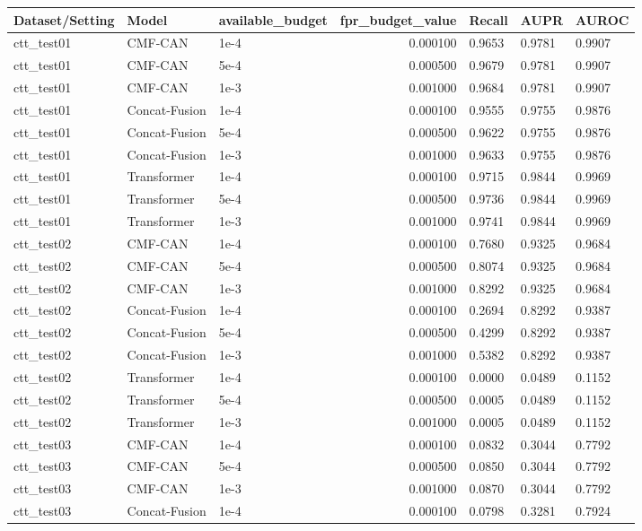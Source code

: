 \begin{tabular}{lllrlll}
\toprule
Dataset/Setting & Model & available_budget & fpr_budget_value & Recall & AUPR & AUROC \\
\midrule
ctt_test01 & CMF-CAN & 1e-4 & 0.000100 & 0.9653 & 0.9781 & 0.9907 \\
ctt_test01 & CMF-CAN & 5e-4 & 0.000500 & 0.9679 & 0.9781 & 0.9907 \\
ctt_test01 & CMF-CAN & 1e-3 & 0.001000 & 0.9684 & 0.9781 & 0.9907 \\
ctt_test01 & Concat-Fusion & 1e-4 & 0.000100 & 0.9555 & 0.9755 & 0.9876 \\
ctt_test01 & Concat-Fusion & 5e-4 & 0.000500 & 0.9622 & 0.9755 & 0.9876 \\
ctt_test01 & Concat-Fusion & 1e-3 & 0.001000 & 0.9633 & 0.9755 & 0.9876 \\
ctt_test01 & Transformer & 1e-4 & 0.000100 & 0.9715 & 0.9844 & 0.9969 \\
ctt_test01 & Transformer & 5e-4 & 0.000500 & 0.9736 & 0.9844 & 0.9969 \\
ctt_test01 & Transformer & 1e-3 & 0.001000 & 0.9741 & 0.9844 & 0.9969 \\
ctt_test02 & CMF-CAN & 1e-4 & 0.000100 & 0.7680 & 0.9325 & 0.9684 \\
ctt_test02 & CMF-CAN & 5e-4 & 0.000500 & 0.8074 & 0.9325 & 0.9684 \\
ctt_test02 & CMF-CAN & 1e-3 & 0.001000 & 0.8292 & 0.9325 & 0.9684 \\
ctt_test02 & Concat-Fusion & 1e-4 & 0.000100 & 0.2694 & 0.8292 & 0.9387 \\
ctt_test02 & Concat-Fusion & 5e-4 & 0.000500 & 0.4299 & 0.8292 & 0.9387 \\
ctt_test02 & Concat-Fusion & 1e-3 & 0.001000 & 0.5382 & 0.8292 & 0.9387 \\
ctt_test02 & Transformer & 1e-4 & 0.000100 & 0.0000 & 0.0489 & 0.1152 \\
ctt_test02 & Transformer & 5e-4 & 0.000500 & 0.0005 & 0.0489 & 0.1152 \\
ctt_test02 & Transformer & 1e-3 & 0.001000 & 0.0005 & 0.0489 & 0.1152 \\
ctt_test03 & CMF-CAN & 1e-4 & 0.000100 & 0.0832 & 0.3044 & 0.7792 \\
ctt_test03 & CMF-CAN & 5e-4 & 0.000500 & 0.0850 & 0.3044 & 0.7792 \\
ctt_test03 & CMF-CAN & 1e-3 & 0.001000 & 0.0870 & 0.3044 & 0.7792 \\
ctt_test03 & Concat-Fusion & 1e-4 & 0.000100 & 0.0798 & 0.3281 & 0.7924 \\

\end{tabular}
